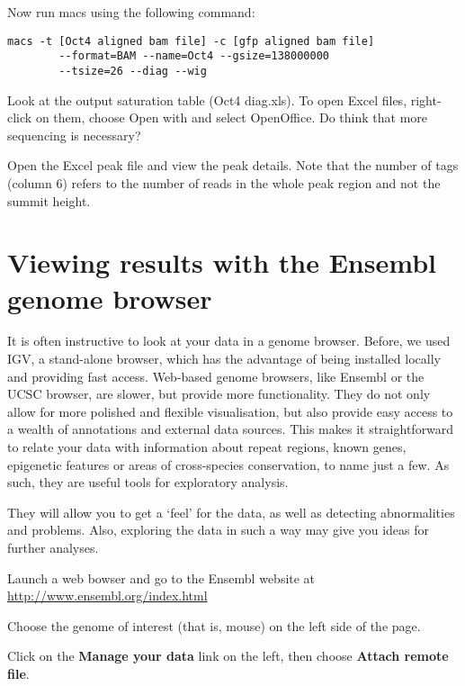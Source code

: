 \begin{steps}
Now run macs using the following command:

\begin{lstlisting}
macs -t [Oct4 aligned bam file] -c [gfp aligned bam file]  
		--format=BAM --name=Oct4 --gsize=138000000 
		--tsize=26 --diag --wig 
\end{lstlisting}

Look at the output saturation table (Oct4 diag.xls). To open Excel files, right-click on them, choose Open with and select OpenOffice. Do think that more sequencing is necessary? 

Open the Excel peak file and view the peak details. Note that the number of tags (column 6) refers to the number of reads in the whole peak region and not the summit height. 

\end{steps}

\section{Viewing results with the Ensembl genome browser}

\begin{information}
It is often instructive to look at your data in a genome browser. Before, we used IGV, a stand-alone browser, which has the advantage of being installed locally and providing fast access. Web-based genome browsers, like Ensembl or the UCSC browser, are slower, but provide more functionality. They do not only allow for more polished and flexible visualisation, but also provide easy access to a wealth of annotations and external data sources. This makes it straightforward to relate your data with information about repeat regions, known genes, epigenetic features or areas of cross-species conservation, to name just a few. As such, they are useful tools for exploratory analysis. 

They will allow you to get a `feel' for the data, as well as detecting abnormalities and problems. Also, exploring the data in such a way may give you ideas for further analyses.
\end{information}

\begin{steps}
Launch a web bowser and go to the Ensembl website at \url{http://www.ensembl.org/index.html}

Choose the genome of interest (that is, mouse) on the left side of the page. 

Click on the \textbf{Manage your data} link on the left, then choose \textbf{Attach remote file}.

\end{steps}

